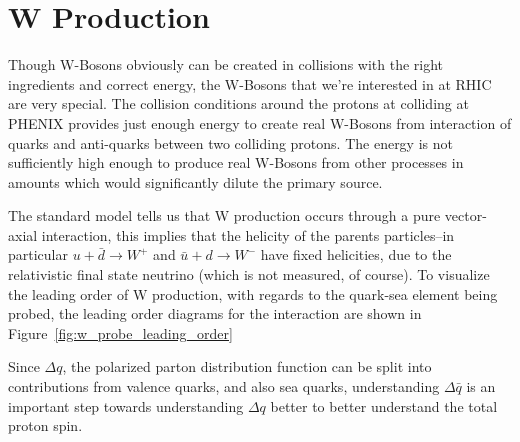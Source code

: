 \clearpage
\section{W Production}

Though W-Bosons obviously can be created in collisions with the right
ingredients and correct energy, the W-Bosons that we're interested in at RHIC
are very special. The collision conditions around the protons at colliding at
PHENIX provides just enough energy to create real W-Bosons from interaction of
quarks and anti-quarks between two colliding protons. The energy is not
sufficiently high enough to produce real W-Bosons from other processes in
amounts which would significantly dilute the primary source.

The standard model tells us that W production occurs through a pure vector-axial
interaction, this implies that the helicity of the parents particles--in
particular $u+\bar{d}\rightarrow W^+$ and $\bar{u}+d\rightarrow W^-$ have fixed
helicities, due to the relativistic final state neutrino (which is not measured,
of course). To visualize the leading order of W production, with regards to the
quark-sea element being probed, the leading order diagrams for the interaction
are shown in Figure~\ref{fig:w_probe_leading_order}~\cite{Aidala2005}

Since $\Delta q$, the polarized parton distribution function can be split into
contributions from valence quarks, and also sea quarks, understanding $\Delta
\bar{q}$ is an important step towards understanding $\Delta q$ better to better
understand the total proton spin.

